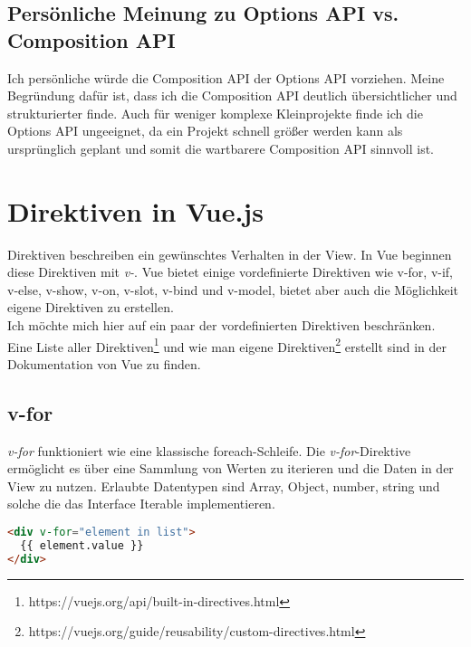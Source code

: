 \subsection*{Persönliche Meinung zu Options API vs. Composition API}
Ich persönliche würde die Composition API der Options API vorziehen.
Meine Begründung dafür ist, dass ich die Composition API deutlich übersichtlicher
und strukturierter finde.
Auch für weniger komplexe Kleinprojekte finde ich die Options API ungeeignet,
da ein Projekt schnell größer werden kann als ursprünglich geplant und somit die
wartbarere Composition API sinnvoll ist.


\section{Direktiven in Vue.js}\label{sec:direktiven-in-vue.js}
Direktiven beschreiben ein gewünschtes Verhalten in der View.
In Vue beginnen diese Direktiven mit \emph{v-}.
Vue bietet einige vordefinierte Direktiven wie v-for, v-if, v-else, v-show, v-on, v-slot, v-bind
und v-model, bietet aber auch die Möglichkeit eigene Direktiven zu erstellen. \cite[S. 10]{steyer2019}
\\
Ich möchte mich hier auf ein paar der vordefinierten Direktiven beschränken.
Eine Liste aller Direktiven\footnote{https://vuejs.org/api/built-in-directives.html}
und wie man eigene Direktiven\footnote{https://vuejs.org/guide/reusability/custom-directives.html}
erstellt sind in der Dokumentation von Vue zu finden.


\subsection*{v-for}
\emph{v-for} funktioniert wie eine klassische foreach-Schleife.
Die \emph{v-for}-Direktive ermöglicht es über eine Sammlung von Werten zu iterieren und die Daten in der View zu nutzen.
Erlaubte Datentypen sind Array, Object, number, string und solche die das Interface Iterable implementieren. \cite{vueDirectives}
\begin{lstlisting}[caption={\emph{v-for}-Direktive},language=html, label={lst:v-for}]
<div v-for="element in list">
  {{ element.value }}
</div>
\end{lstlisting}

\newpage

